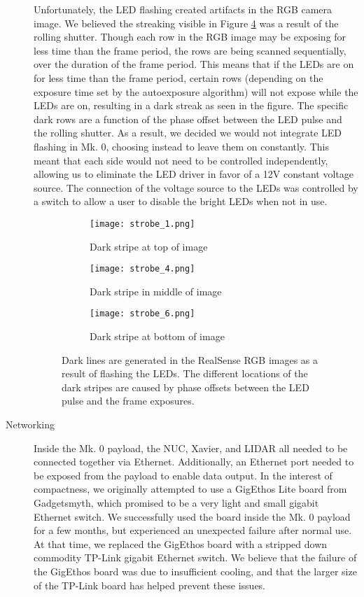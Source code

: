 \begin{description}
	Unfortunately, the LED flashing created artifacts in the RGB camera image. We believed the streaking visible in Figure \ref{strobe_images} was a result of the rolling shutter. Though each row in the RGB image may be exposing for less time than the frame period, the rows are being scanned sequentially, over the duration of the frame period. This means that if the LEDs are on for less time than the frame period, certain rows (depending on the exposure time set by the autoexposure algorithm) will not expose while the LEDs are on, resulting in a dark streak as seen in the figure. The specific dark rows are a function of the phase offset between the LED pulse and the rolling shutter. As a result, we decided we would not integrate LED flashing in Mk. 0, choosing instead to leave them on constantly. This meant that each side would not need to be controlled independently, allowing us to eliminate the LED driver in favor of a 12V constant voltage source. The connection of the voltage source to the LEDs was controlled by a switch to allow a user to disable the bright LEDs when not in use.
			
	\begin{figure}
		\centering
		\begin{subfigure}{0.3\textwidth}
			\texttt{[image: strobe\_1.png]}
			\caption{Dark stripe at top of image}
			\label{strobe_top}
		\end{subfigure}		
		\hfill
		\begin{subfigure}{0.3\textwidth}
			\texttt{[image: strobe\_4.png]}
			\caption{Dark stripe in middle of image}
			\label{strobe_middle}		
		\end{subfigure}
		\hfill
		\begin{subfigure}{0.3\textwidth}
			\texttt{[image: strobe\_6.png]}
			\caption{Dark stripe at bottom of image}
			\label{strobe_bottom}
		\end{subfigure}	
		\caption[Dark lines in RealSense RGB images with LED flashing]{Dark lines are generated in the RealSense RGB images as a result of flashing the LEDs. The different locations of the dark stripes are caused by phase offsets between the LED pulse and the frame exposures.}
		\label{strobe_images}
	\end{figure}	

	\item[Networking] Inside the Mk. 0 payload, the NUC, Xavier, and LIDAR all needed to be connected together via Ethernet. Additionally, an Ethernet port needed to be exposed from the payload to enable data output. In the interest of compactness, we originally attempted to use a GigEthos Lite board from Gadgetsmyth, which promised to be a very light and small gigabit Ethernet switch. We successfully used the board inside the Mk. 0 payload for a few months, but experienced an unexpected failure after normal use. At that time, we replaced the GigEthos board with a stripped down commodity TP-Link gigabit Ethernet switch. We believe that the failure of the GigEthos board was due to insufficient cooling, and that the larger size of the TP-Link board has helped prevent these issues.
	

\end{description}
